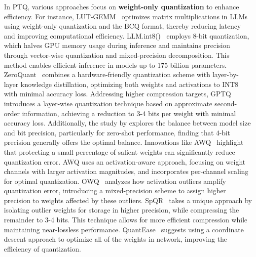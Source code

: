 In PTQ, various approaches focus on \textbf{weight-only quantization} to enhance efficiency. For instance, LUT-GEMM~\citep{park2023lut} optimizes matrix multiplications in LLMs using weight-only quantization and the BCQ format, thereby reducing latency and improving computational efficiency. 
 LLM.int8()~\citep{dettmers2022llm} employs 8-bit quantization, which halves GPU memory usage during inference and maintains precision through vector-wise quantization and mixed-precision decomposition. This method enables efficient inference in models up to 175 billion parameters. 
ZeroQuant~\citep{yao2022zeroquant} combines a hardware-friendly quantization scheme with layer-by-layer knowledge distillation, optimizing both weights and activations to INT8 with minimal accuracy loss. 
Addressing higher compression targets, GPTQ~\citep{frantar2022gptq} introduces a layer-wise quantization technique based on approximate second-order information, achieving a reduction to 3-4 bits per weight with minimal accuracy loss. Additionally, the study by \cite{dettmers2023case} explores the balance between model size and bit precision, particularly for zero-shot performance, finding that 4-bit precision generally offers the optimal balance.
Innovations like AWQ~\citep{lin2023awq, kim2023squeezellm} highlight that protecting a small percentage of salient weights can significantly reduce quantization error. AWQ uses an activation-aware approach, focusing on weight channels with larger activation magnitudes, and incorporates per-channel scaling for optimal quantization. OWQ~\citep{lee2023owq} analyzes how activation outliers amplify quantization error, introducing a mixed-precision scheme to assign higher precision to weights affected by these outliers. SpQR~\citep{dettmers2023spqr} takes a unique approach by isolating outlier weights for storage in higher precision, while compressing the remainder to 3-4 bits. This technique allows for more efficient compression while maintaining near-lossless performance.
QuantEase~\citep{behdin2023quantease} suggests using a coordinate descent approach to optimize all of the weights in network, improving the efficiency of quantization.



